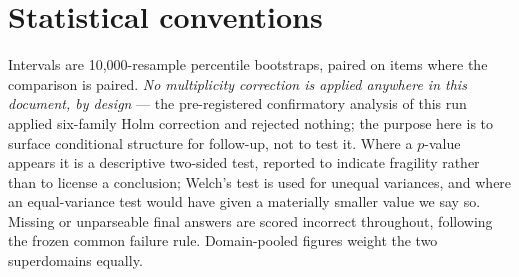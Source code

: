 \documentclass[10pt,a4paper]{article}
\begin{document}
\section{Statistical conventions}\label{app:stats}
Intervals are 10{,}000-resample percentile bootstraps, paired on items where the comparison is paired. \emph{No multiplicity correction is applied anywhere in this document, by design} --- the pre-registered confirmatory analysis of this run applied six-family Holm correction and rejected nothing; the purpose here is to surface conditional structure for follow-up, not to test it. Where a $p$-value appears it is a descriptive two-sided test, reported to indicate fragility rather than to license a conclusion; Welch's test is used for unequal variances, and where an equal-variance test would have given a materially smaller value we say so. Missing or unparseable final answers are scored incorrect throughout, following the frozen common failure rule. Domain-pooled figures weight the two superdomains equally.



\end{document}
